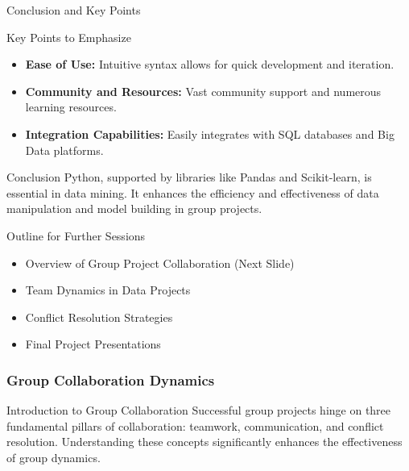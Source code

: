 \documentclass[aspectratio=169]{beamer}
\begin{document}
\begin{frame}{Conclusion and Key Points}
    \begin{block}{Key Points to Emphasize}
        \begin{itemize}
            \item \textbf{Ease of Use:} Intuitive syntax allows for quick development and iteration.
            \item \textbf{Community and Resources:} Vast community support and numerous learning resources.
            \item \textbf{Integration Capabilities:} Easily integrates with SQL databases and Big Data platforms.
        \end{itemize}
    \end{block}
    \begin{block}{Conclusion}
        Python, supported by libraries like Pandas and Scikit-learn, is essential in data mining. It enhances the efficiency and effectiveness of data manipulation and model building in group projects.
    \end{block}
\end{frame}

\begin{frame}{Outline for Further Sessions}
    \begin{itemize}
        \item Overview of Group Project Collaboration (Next Slide)
        \item Team Dynamics in Data Projects
        \item Conflict Resolution Strategies
        \item Final Project Presentations
    \end{itemize}
\end{frame}

\begin{frame}[fragile]
    \frametitle{Group Collaboration Dynamics}
    \begin{block}{Introduction to Group Collaboration}
        Successful group projects hinge on three fundamental pillars of collaboration: teamwork, communication, and conflict resolution. Understanding these concepts significantly enhances the effectiveness of group dynamics.
    \end{block}
\end{frame}
\end{document}
